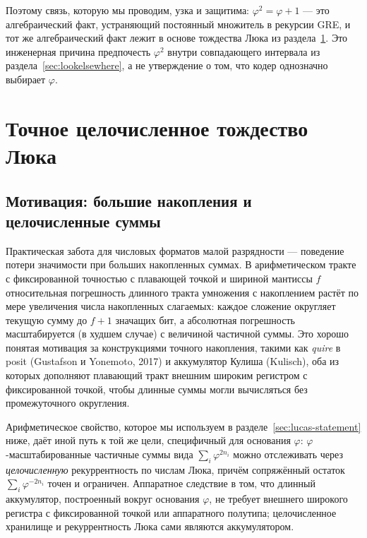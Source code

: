 \documentclass[11pt,a4paper]{article}
\theoremstyle{plain}
\begin{document}
Поэтому связь, которую мы проводим, узка и защитима:
\(\varphi^{2} = \varphi + 1\) --- это алгебраический факт, устраняющий
постоянный множитель в рекурсии GRE, и тот же алгебраический факт лежит в основе
тождества Люка из раздела~\ref{sec:lucas}. Это инженерная причина предпочесть
\(\varphi^{2}\) внутри совпадающего интервала из раздела~\ref{sec:lookelsewhere},
а не утверждение о том, что кодер однозначно выбирает \(\varphi\).

\section{Точное целочисленное тождество Люка}\label{sec:lucas}

\subsection{Мотивация: большие накопления и целочисленные суммы}
\label{sec:lucas-motivation}

Практическая забота для числовых форматов малой разрядности --- поведение
потери значимости при больших накопленных суммах. В арифметическом тракте с
фиксированной точностью с плавающей точкой и шириной мантиссы \(f\)
относительная погрешность длинного тракта умножения с накоплением растёт по мере
увеличения числа накопленных слагаемых: каждое сложение округляет текущую сумму
до \(f+1\) значащих бит, а абсолютная погрешность масштабируется (в худшем
случае) с величиной частичной суммы. Это хорошо понятая мотивация за
конструкциями точного накопления, такими как \emph{quire} в posit (Gustafson и
Yonemoto, 2017) и аккумулятор Кулиша (Kulisch), оба из которых дополняют
плавающий тракт внешним широким регистром с фиксированной точкой, чтобы длинные
суммы могли вычисляться без промежуточного округления.

Арифметическое свойство, которое мы используем в
разделе~\ref{sec:lucas-statement} ниже, даёт иной путь к той же цели,
специфичный для основания \(\varphi\): \(\varphi\)-масштабированные частичные
суммы вида \(\sum_i \varphi^{2 n_i}\) можно отслеживать через \emph{целочисленную}
рекуррентность по числам Люка, причём сопряжённый остаток
\(\sum_i \varphi^{-2 n_i}\) точен и ограничен. Аппаратное следствие в том, что
длинный аккумулятор, построенный вокруг основания \(\varphi\), не требует
внешнего широкого регистра с фиксированной точкой или аппаратного полутипа;
целочисленное хранилище и рекуррентность Люка сами являются аккумулятором.
\end{document}
